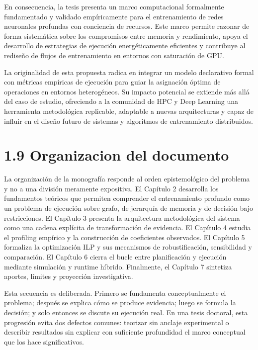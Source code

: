 En consecuencia, la tesis presenta un marco computacional formalmente fundamentado y validado empíricamente para el entrenamiento de redes neuronales profundas con conciencia de recursos. Este marco permite razonar de forma sistemática sobre los compromisos entre memoria y rendimiento, apoya el desarrollo de estrategias de ejecución energéticamente eficientes y contribuye al rediseño de flujos de entrenamiento en entornos con saturación de GPU.

La originalidad de esta propuesta radica en integrar un modelo declarativo formal con métricas empíricas de ejecución para guiar la asignación óptima de operaciones en entornos heterogéneos. Su impacto potencial se extiende más allá del caso de estudio, ofreciendo a la comunidad de HPC y Deep Learning una herramienta metodológica replicable, adaptable a nuevas arquitecturas y capaz de influir en el diseño futuro de sistemas y algoritmos de entrenamiento distribuidos.

\section{1.9 Organizacion del documento}
La organización de la monografía responde al orden epistemológico del problema y no a una división meramente expositiva. El Capítulo 2 desarrolla los fundamentos teóricos que permiten comprender el entrenamiento profundo como un problema de ejecución sobre grafo, de jerarquía de memoria y de decisión bajo restricciones. El Capítulo 3 presenta la arquitectura metodológica del sistema como una cadena explícita de transformación de evidencia. El Capítulo 4 estudia el profiling empírico y la construcción de coeficientes observados. El Capítulo 5 formaliza la optimización ILP y sus mecanismos de robustificación, sensibilidad y comparación. El Capítulo 6 cierra el bucle entre planificación y ejecución mediante simulación y runtime híbrido. Finalmente, el Capítulo 7 sintetiza aportes, límites y proyección investigativa.

Esta secuencia es deliberada. Primero se fundamenta conceptualmente el problema; después se explica cómo se produce evidencia; luego se formula la decisión; y solo entonces se discute su ejecución real. En una tesis doctoral, esta progresión evita dos defectos comunes: teorizar sin anclaje experimental o describir resultados sin explicar con suficiente profundidad el marco conceptual que los hace significativos.
